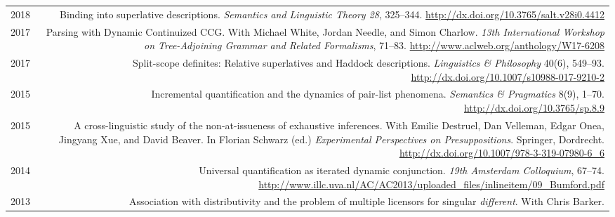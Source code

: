 \documentclass[12pt]{article}
\newcommand{\doi}[1]{\url{http://dx.doi.org/#1}}
\begin{document}
\begin{longtable}{LR}
  2018  & Binding into superlative descriptions.\newline
          \textit{Semantics and Linguistic Theory 28}, 325--344.\newline
          \doi{10.3765/salt.v28i0.4412}\\
  2017  & Parsing with Dynamic Continuized CCG.\newline
          With Michael White, Jordan Needle, and Simon Charlow.\newline
          \textit{13th International Workshop on Tree-Adjoining Grammar and
          Related Formalisms}, 71--83.\newline
          \url{http://www.aclweb.org/anthology/W17-6208}\\
  2017  & Split-scope definites: Relative superlatives and Haddock
          descriptions.\newline
          \textit{Linguistics \& Philosophy} 40(6), 549--93.\newline
          \doi{10.1007/s10988-017-9210-2}\\
  2015  & Incremental quantification and the dynamics of pair-list phenomena.\newline
          \textit{Semantics \& Pragmatics} 8(9), 1--70.\newline
          \doi{10.3765/sp.8.9}\\
  2015  & A cross-linguistic study of the non-at-issueness of exhaustive
          inferences.\newline
          With Emilie Destruel, Dan Velleman, Edgar Onea, Jingyang Xue, and
          David Beaver.\newline
          In Florian Schwarz (ed.) \textit{Experimental Perspectives on
          Presuppositions}. Springer, Dordrecht.\newline
          \doi{10.1007/978-3-319-07980-6_6}\\ %
  2014  & Universal quantification as iterated dynamic conjunction.\newline
          \textit{19th Amsterdam Colloquium}, 67--74.\newline
          \url{http://www.illc.uva.nl/AC/AC2013/uploaded_files/inlineitem/09_Bumford.pdf}\\
  2013  & Association with distributivity and the problem of multiple
          licensors for singular \textit{different}.\newline
          With Chris Barker.\newline

\end{longtable}
\end{document}
